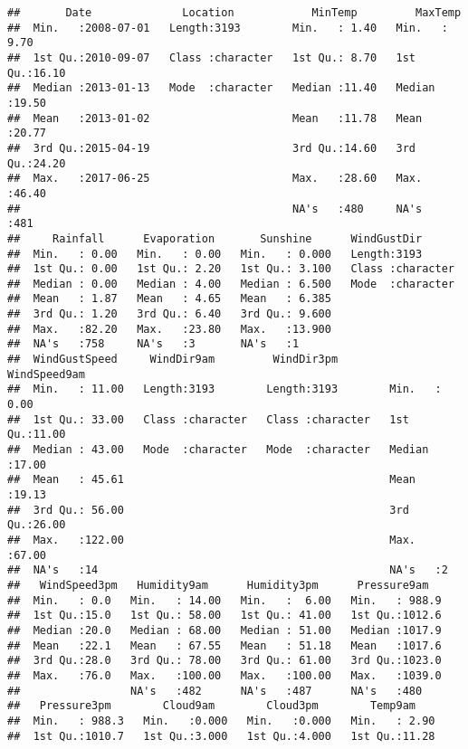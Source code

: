 \documentclass[
]{article}
\begin{document}
\begin{verbatim}
##       Date              Location            MinTemp         MaxTemp     
##  Min.   :2008-07-01   Length:3193        Min.   : 1.40   Min.   : 9.70  
##  1st Qu.:2010-09-07   Class :character   1st Qu.: 8.70   1st Qu.:16.10  
##  Median :2013-01-13   Mode  :character   Median :11.40   Median :19.50  
##  Mean   :2013-01-02                      Mean   :11.78   Mean   :20.77  
##  3rd Qu.:2015-04-19                      3rd Qu.:14.60   3rd Qu.:24.20  
##  Max.   :2017-06-25                      Max.   :28.60   Max.   :46.40  
##                                          NA's   :480     NA's   :481    
##     Rainfall      Evaporation       Sunshine      WindGustDir       
##  Min.   : 0.00   Min.   : 0.00   Min.   : 0.000   Length:3193       
##  1st Qu.: 0.00   1st Qu.: 2.20   1st Qu.: 3.100   Class :character  
##  Median : 0.00   Median : 4.00   Median : 6.500   Mode  :character  
##  Mean   : 1.87   Mean   : 4.65   Mean   : 6.385                     
##  3rd Qu.: 1.20   3rd Qu.: 6.40   3rd Qu.: 9.600                     
##  Max.   :82.20   Max.   :23.80   Max.   :13.900                     
##  NA's   :758     NA's   :3       NA's   :1                          
##  WindGustSpeed     WindDir9am         WindDir3pm         WindSpeed9am  
##  Min.   : 11.00   Length:3193        Length:3193        Min.   : 0.00  
##  1st Qu.: 33.00   Class :character   Class :character   1st Qu.:11.00  
##  Median : 43.00   Mode  :character   Mode  :character   Median :17.00  
##  Mean   : 45.61                                         Mean   :19.13  
##  3rd Qu.: 56.00                                         3rd Qu.:26.00  
##  Max.   :122.00                                         Max.   :67.00  
##  NA's   :14                                             NA's   :2      
##   WindSpeed3pm   Humidity9am      Humidity3pm      Pressure9am    
##  Min.   : 0.0   Min.   : 14.00   Min.   :  6.00   Min.   : 988.9  
##  1st Qu.:15.0   1st Qu.: 58.00   1st Qu.: 41.00   1st Qu.:1012.6  
##  Median :20.0   Median : 68.00   Median : 51.00   Median :1017.9  
##  Mean   :22.1   Mean   : 67.55   Mean   : 51.18   Mean   :1017.6  
##  3rd Qu.:28.0   3rd Qu.: 78.00   3rd Qu.: 61.00   3rd Qu.:1023.0  
##  Max.   :76.0   Max.   :100.00   Max.   :100.00   Max.   :1039.0  
##                 NA's   :482      NA's   :487      NA's   :480     
##   Pressure3pm        Cloud9am        Cloud3pm        Temp9am     
##  Min.   : 988.3   Min.   :0.000   Min.   :0.000   Min.   : 2.90  
##  1st Qu.:1010.7   1st Qu.:3.000   1st Qu.:4.000   1st Qu.:11.28  

\end{verbatim}
\end{document}
